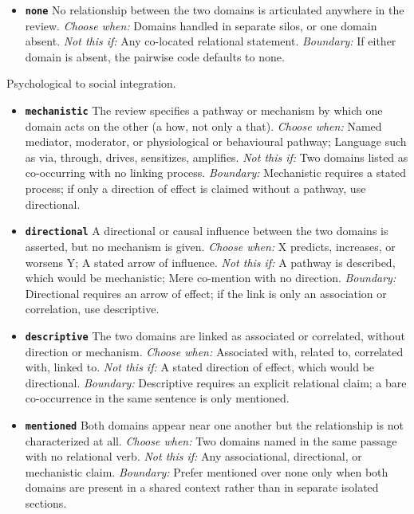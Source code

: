 \documentclass[11pt]{article}
\begin{document}
\begin{description}
\begin{itemize}[leftmargin=1.3em,itemsep=2pt,topsep=2pt]
  \item \textbf{\texttt{none}} No relationship between the two domains is articulated anywhere in the review. {\small \textit{Choose when:} Domains handled in separate silos, or one domain absent. \textit{Not this if:} Any co-located relational statement. \textit{Boundary:} If either domain is absent, the pairwise code defaults to none.}
  \end{itemize}
\item[\texttt{integration\_psych\_social}] Psychological to social integration.
  \begin{itemize}[leftmargin=1.3em,itemsep=2pt,topsep=2pt]
  \item \textbf{\texttt{mechanistic}} The review specifies a pathway or mechanism by which one domain acts on the other (a how, not only a that). {\small \textit{Choose when:} Named mediator, moderator, or physiological or behavioural pathway; Language such as via, through, drives, sensitizes, amplifies. \textit{Not this if:} Two domains listed as co-occurring with no linking process. \textit{Boundary:} Mechanistic requires a stated process; if only a direction of effect is claimed without a pathway, use directional.}
  \item \textbf{\texttt{directional}} A directional or causal influence between the two domains is asserted, but no mechanism is given. {\small \textit{Choose when:} X predicts, increases, or worsens Y; A stated arrow of influence. \textit{Not this if:} A pathway is described, which would be mechanistic; Mere co-mention with no direction. \textit{Boundary:} Directional requires an arrow of effect; if the link is only an association or correlation, use descriptive.}
  \item \textbf{\texttt{descriptive}} The two domains are linked as associated or correlated, without direction or mechanism. {\small \textit{Choose when:} Associated with, related to, correlated with, linked to. \textit{Not this if:} A stated direction of effect, which would be directional. \textit{Boundary:} Descriptive requires an explicit relational claim; a bare co-occurrence in the same sentence is only mentioned.}
  \item \textbf{\texttt{mentioned}} Both domains appear near one another but the relationship is not characterized at all. {\small \textit{Choose when:} Two domains named in the same passage with no relational verb. \textit{Not this if:} Any associational, directional, or mechanistic claim. \textit{Boundary:} Prefer mentioned over none only when both domains are present in a shared context rather than in separate isolated sections.}

\end{itemize}
\end{description}
\end{document}
